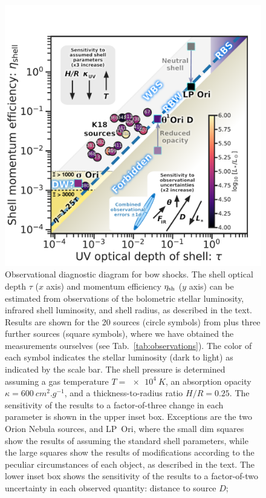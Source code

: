 \message{ !name(bs-bw-dw-03.tex)}\documentclass[useAMS, usenatbib, a4paper]{mnras}
\begin{document}
\begin{figure}
  \centering
  \includegraphics[width=0.8\linewidth]{figs/All-sources-eta-tau}
  \caption[Observational diagnostic diagram]{Observational diagnostic
    diagram for bow shocks.  The shell optical depth \(\tau\) (\(x\)
    axis) and momentum efficiency \(\eta_{\text{sh}}\) (\(y\) axis) can be
    estimated from observations of the bolometric stellar luminosity,
    infrared shell luminosity, and shell radius, as described in the
    text.  Results are shown for the 20 sources (circle symbols) from
    \citet{Kobulnicky:2018a} plus three further sources (square
    symbols), where we have obtained the measurements ourselves (see
    Tab.~\ref{tab:observations}).  The color of each symbol indicates
    the stellar luminosity (dark to light) as indicated by the scale
    bar. The shell pressure is determined assuming a gas temperature
    \(T = \SI{e4}{K}\), an absorption opacity
    \(\kappa = \SI{600}{cm^2.g^{-1}}\), and a thickness-to-radius ratio
    \(H/R = 0.25\).  The sensitivity of the results to a
    factor-of-three change in each parameter is shown in the upper
    inset box.  Exceptions are the two Orion Nebula sources, \thD{}
    and LP~Ori, where the small dim squares show the results of
    assuming the standard shell parameters, while the large squares
    show the results of modifications according to the peculiar
    circumstances of each object, as described in the text.  The lower
    inset box shows the sensitivity of the results to a factor-of-two
    uncertainty in each observed quantity: distance to source \(D\);
}
\end{figure}
\end{document}
